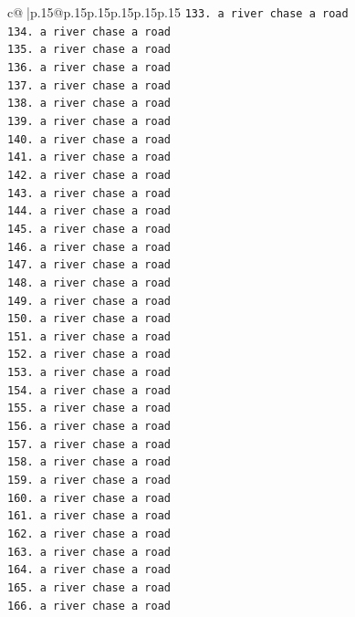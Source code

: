 \documentclass{article}
\begin{document}
{\begin{supertabular}{c@{$\;$}|p{.15\linewidth}@{}p{.15\linewidth}p{.15\linewidth}p{.15\linewidth}p{.15\linewidth}p{.15\linewidth}}
{{{\texttt{133. a river chase a road} \\
\texttt{134. a river chase a road} \\
\texttt{135. a river chase a road} \\
\texttt{136. a river chase a road} \\
\texttt{137. a river chase a road} \\
\texttt{138. a river chase a road} \\
\texttt{139. a river chase a road} \\
\texttt{140. a river chase a road} \\
\texttt{141. a river chase a road} \\
\texttt{142. a river chase a road} \\
\texttt{143. a river chase a road} \\
\texttt{144. a river chase a road} \\
\texttt{145. a river chase a road} \\
\texttt{146. a river chase a road} \\
\texttt{147. a river chase a road} \\
\texttt{148. a river chase a road} \\
\texttt{149. a river chase a road} \\
\texttt{150. a river chase a road} \\
\texttt{151. a river chase a road} \\
\texttt{152. a river chase a road} \\
\texttt{153. a river chase a road} \\
\texttt{154. a river chase a road} \\
\texttt{155. a river chase a road} \\
\texttt{156. a river chase a road} \\
\texttt{157. a river chase a road} \\
\texttt{158. a river chase a road} \\
\texttt{159. a river chase a road} \\
\texttt{160. a river chase a road} \\
\texttt{161. a river chase a road} \\
\texttt{162. a river chase a road} \\
\texttt{163. a river chase a road} \\
\texttt{164. a river chase a road} \\
\texttt{165. a river chase a road} \\
\texttt{166. a river chase a road} \\
}}}
\end{supertabular}}
\end{document}
